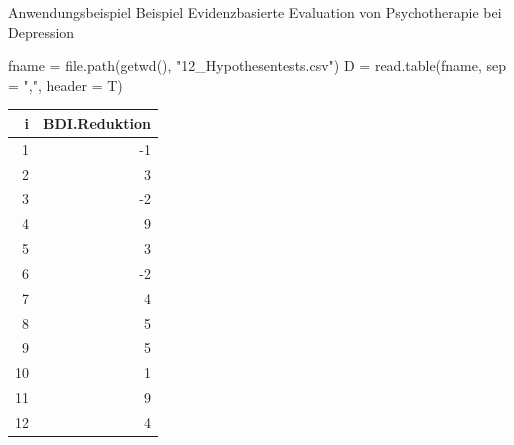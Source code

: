 \documentclass[
  8pt,
  ignorenonframetext,
]{beamer}
\newenvironment{Shaded}{\begin{snugshade}}{\end{snugshade}}
\newcommand{\AttributeTok}[1]{\textcolor[rgb]{0.77,0.63,0.00}{#1}}
\newcommand{\FunctionTok}[1]{\textcolor[rgb]{0.00,0.00,0.00}{#1}}
\newcommand{\NormalTok}[1]{#1}
\newcommand{\OtherTok}[1]{\textcolor[rgb]{0.56,0.35,0.01}{#1}}
\newcommand{\StringTok}[1]{\textcolor[rgb]{0.31,0.60,0.02}{#1}}
\begin{document}
\begin{frame}[fragile]{Anwendungsbeispiel}
\protect\hypertarget{anwendungsbeispiel-1}{}
Beispiel \textbar{} Evidenzbasierte Evaluation von Psychotherapie bei
Depression \vspace{2mm}

\footnotesize

\begin{Shaded}
\begin{Highlighting}[]
\NormalTok{fname }\OtherTok{=} \FunctionTok{file.path}\NormalTok{(}\FunctionTok{getwd}\NormalTok{(), }\StringTok{"12\_Hypothesentests.csv"}\NormalTok{)}
\NormalTok{D     }\OtherTok{=} \FunctionTok{read.table}\NormalTok{(fname, }\AttributeTok{sep =} \StringTok{","}\NormalTok{, }\AttributeTok{header =}\NormalTok{ T)}
\end{Highlighting}
\end{Shaded}

\vspace{2mm}

\begin{longtable}[]{@{}rr@{}}
\toprule()
i & BDI.Reduktion \\
\midrule()
\endhead
1 & -1 \\
2 & 3 \\
3 & -2 \\
4 & 9 \\
5 & 3 \\
6 & -2 \\
7 & 4 \\
8 & 5 \\
9 & 5 \\
10 & 1 \\
11 & 9 \\
12 & 4 \\
\bottomrule()
\end{longtable}
\end{frame}
\end{document}
